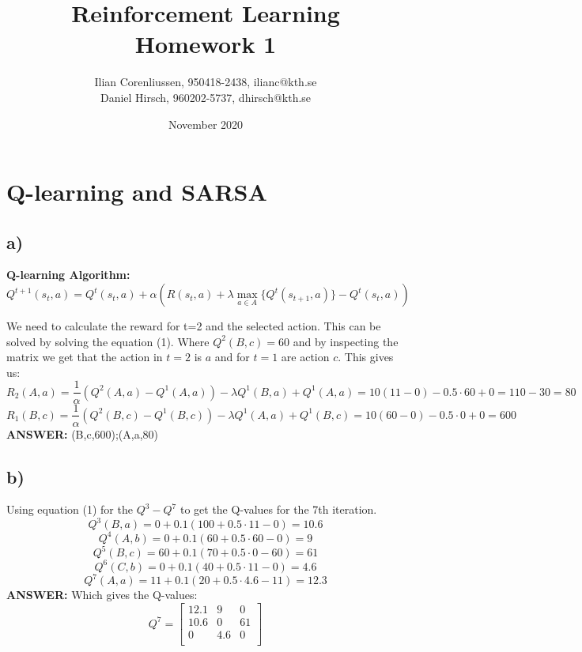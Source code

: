 \documentclass{article}
\title{Reinforcement Learning\\
       Homework 1}
\author{Ilian Corenliussen, 950418-2438, ilianc@kth.se\\ 
        Daniel Hirsch, 960202-5737, dhirsch@kth.se}
\date{November 2020}
\begin{document}
\maketitle

\section{Q-learning and SARSA}
\subsection*{a)}
\textbf{Q-learning Algorithm:} \begin{equation}
 Q^{t+1}(s_t,a) = Q^t(s_t,a) + \alpha \left(R(s_t,a) + \lambda \max_{a \in A}\{Q^t(s_{t+1}, a)\} - Q^t(s_t,a) \right)\end{equation}

We need to calculate the reward for t=2 and the selected action. This can be solved by solving the equation (1). Where $Q^2(B,c)=60$ and by inspecting the matrix we get that the action in $t=2$ is $a$ and for $t=1$ are action $c$. This gives us:
\begin{equation*}
    R_2(A,a) =  \frac{1}{\alpha}(Q^{2}(A,a) - Q^1(A,a) ) - \lambda Q^1(B, a) + Q^1(A,a) = 10( 11 - 0) - 0.5\cdot60 + 0 = 110-30= 80
\end{equation*}
\begin{equation*}
    R_1(B,c) =  \frac{1}{\alpha}(Q^{2}(B,c) - Q^1(B,c) ) - \lambda Q^1(A, a) + Q^1(B, c) = 10( 60 - 0) - 0.5\cdot 0 + 0 = 600
\end{equation*}
\textbf{ANSWER:} (B,c,600);(A,a,80)

\subsection*{b)}
Using equation (1) for the $Q^3-Q^7$ to get the Q-values for the 7th iteration.
\begin{equation*}
     Q^{3}(B,a) = 0 + 0.1(100 + 0.5\cdot11 - 0 ) = 10.6
\end{equation*}
\begin{equation*}
     Q^{4}(A,b) = 0 + 0.1(60 + 0.5\cdot60 - 0 ) = 9
\end{equation*}
\begin{equation*}
     Q^{5}(B,c) = 60 + 0.1(70 + 0.5\cdot0 -60 ) = 61
\end{equation*}
\begin{equation*}
     Q^{6}(C,b) = 0 + 0.1(40 + 0.5\cdot11 - 0 ) = 4.6
\end{equation*}
\begin{equation*}
     Q^{7}(A,a) = 11 + 0.1(20 + 0.5\cdot4.6 -11 ) = 12.3
\end{equation*}
\textbf{ANSWER:} Which gives the Q-values:
\begin{equation*}
    Q^7=
    \left[
    \begin{array}{ccc}
         12.1 & 9 & 0 \\
         10.6 & 0 & 61 \\
         0 & 4.6 & 0 \\
    \end{array}
    \right]
\end{equation*}
\end{document}
